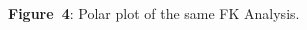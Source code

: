 \documentclass[final]{lmuposter}
\begin{document}
\begin{multicols}{2}
{\begin{multicols}{2}
\begin{center}
	{\small
	\textbf{Figure~4}: Polar plot of the same FK Analysis.
	} \\[.5\MyBoxVSep]
\end{center}
\end{multicols}
}\vspace{\MyBoxVSep}

\end{multicols}
\vspace{-0.60cm}
\vspace{\MyBoxVSep}
\end{document}
